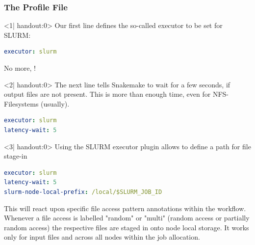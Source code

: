 \begin{frame}[fragile]
	\frametitle{The \Snakemake{} Profile File}
	\begin{onlyenv}<1| handout:0>
		Our first line defines the so-called executor to be set for SLURM:
		\begin{lstlisting}[language={yaml}]
executor: slurm
		\end{lstlisting}
		No more, !
	\end{onlyenv}
	\begin{onlyenv}<2| handout:0>
		The next line tells Snakemake to wait for a few seconds, if output files are not present. This is more than enough time, even for NFS-Filesystems (usually). 
		\begin{lstlisting}[language={yaml}]
executor: slurm
latency-wait: 5
		\end{lstlisting}
	\end{onlyenv}
	\begin{onlyenv}<3| handout:0>
		Using the SLURM executor plugin allows to define a path for file stage-in 
		\begin{lstlisting}[language={yaml}]
executor: slurm
latency-wait: 5
slurm-node-local-prefix: /local/$SLURM_JOB_ID
		\end{lstlisting}
			\begin{warning}
			This will react upon specific file access pattern annotations within the workflow. Whenever a file access is labelled "random" or "multi" (random access or partially random access) the respective files are staged in onto node local storage. It works only for input files and across all nodes within the job allocation. 
		\end{warning}
	\end{onlyenv}
\end{frame}

